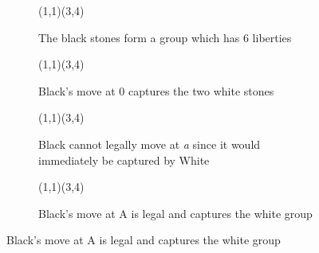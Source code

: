 \documentclass[../math194_paper.tex]{subfiles}
\begin{document}
\begin{figure}[H]
\begin{subfigure}[b]{0.45\linewidth}
\centering
\begin{psgopartialboard*}{(1,1)(3,4)}
    
\end{psgopartialboard*}
\caption{The black stones form a group which has 6 liberties}
\end{subfigure}
\quad
\begin{subfigure}[b]{0.45\linewidth}
\centering
\begin{psgopartialboard*}{(1,1)(3,4)}
    
\end{psgopartialboard*}
\caption{Black's move at 0 captures the two white stones}
\end{subfigure}

\begin{subfigure}[b]{0.45\linewidth}
\centering
\begin{psgopartialboard*}{(1,1)(3,4)}
    
\end{psgopartialboard*}
\caption{Black cannot legally move at \textit{a} since it would immediately be captured by White}
\end{subfigure}
\quad 
\begin{subfigure}[b]{0.45\linewidth}
\centering
\begin{psgopartialboard*}{(1,1)(3,4)}
\end{psgopartialboard*}
\caption{Black's move at A is legal and captures the white group}
\end{subfigure}


\end{figure}
\end{document}
